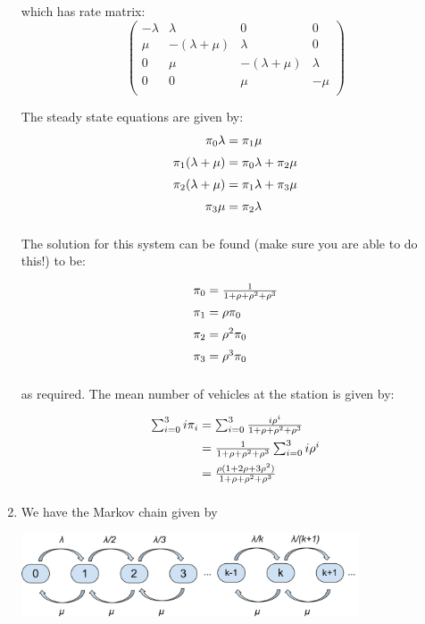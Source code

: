 \documentclass[12pt]{article}
\begin{document}
\begin{enumerate}
which has rate matrix:
$$\begin{pmatrix}
-\lambda & \lambda & 0&0\\
\mu &-(\lambda + \mu )&\lambda&0\\
0 & \mu &-(\lambda+\mu)&\lambda\\
0 & 0 &\mu&-\mu\\
\end{pmatrix}
$$

The steady state equations are given by:
$$\begin{array}{@{}r@{\;}c@{\;}l@{}}
\pi_0\lambda&=&\pi_1\mu\\[2mm]
\pi_1(\lambda+\mu)&=&\pi_0\lambda+\pi_2\mu\\[2mm]
\pi_2(\lambda+\mu)&=&\pi_1\lambda+\pi_3\mu\\[2mm]
\pi_3\mu&=&\pi_{2}\lambda\\[2mm]
\end{array}$$

The solution for this system can be found (make sure you are able to do this!) to be:

$$\begin{array}{@{}r@{\;}c@{\;}l@{}}
\pi_0&=&{1\over 1+\rho+\rho^2+\rho^3}\\[2mm]
\pi_1&=&\rho\pi_0\\[2mm]
\pi_2&=&\rho^2\pi_0\\[2mm]
\pi_3&=&\rho^3\pi_0\\[2mm]
\end{array}$$

as required. The mean number of vehicles at the station is given by:

$$\begin{array}{@{}r@{\;}c@{\;}l@{}}
\sum_{i=0}^3i\pi_i&=&\sum_{i=0}^3{i\rho^i\over 1+\rho+\rho^2+\rho^3}\\[2mm]
&=&{1\over 1+\rho+\rho^2+\rho^3}\sum_{i=0}^3i\rho^i\\[2mm]
&=&{\rho(1+2\rho+3\rho^2)\over 1+\rho+\rho^2+\rho^3}\\[2mm]
\end{array}$$


\item We have the Markov chain given by

\begin{center}
\includegraphics[width=10cm]{exercise_6_markov_chain.pdf}
\end{center}


\end{enumerate}
\end{document}
